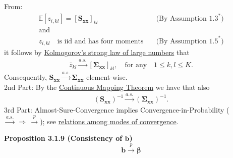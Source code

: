\documentclass[]{book}
\theoremstyle{definition}
\theoremstyle{definition}
\theoremstyle{definition}
\theoremstyle{remark}
\begin{document}
From: \[\begin{array}{ll}
\mathbb{E}[z_{i,kl}]=[\mathbf{S}_{\mathbf{x}\mathbf{x}}]_{kl}&\quad\text{(By Assumption 1.3}^\ast)\\
\text{and}&\\
z_{i,kl}\quad\text{is iid and has four moments}      &\quad\text{(By Assumption 1.5}^\ast)
\end{array}\] it follows by \href{https://www.statlect.com/asymptotic-theory/law-of-large-numbers}{Kolmogorov's strong law of large numbers}
that \[\begin{align*}
\bar{z}_{kl}\overset{a.s.}\longrightarrow \left[\boldsymbol{\Sigma}_{\mathbf{x}\mathbf{x}}\right]_{kl},\quad\text{for any}\quad 1\leq k,l\leq K.
\end{align*}\]
Consequently,
\(\mathbf{S}_{\mathbf{x}\mathbf{x}}\overset{a.s.}\longrightarrow\boldsymbol{\Sigma}_{\mathbf{x}\mathbf{x}}\)
element-wise.\\
2nd Part: By the \href{https://www.statlect.com/asymptotic-theory/continuous-mapping-theorem}{Continuous Mapping Theorem}
we have that also \[\begin{align*}
\left(\mathbf{S}_{\mathbf{x}\mathbf{x}}\right)^{-1}\overset{a.s.}\longrightarrow\left(\boldsymbol{\Sigma}_{\mathbf{x}\mathbf{x}}\right)^{-1}.
\end{align*}\]
3rd Part: Almost-Sure-Convergence implies Convergence-in-Probability
(\(\overset{a.s.}\longrightarrow \, \Rightarrow \, \overset{p}\longrightarrow\)); see \href{https://www.statlect.com/asymptotic-theory/relations-among-modes-of-convergence}{relations among modes of convergence}.

\textbf{Proposition 3.1.9 (Consistency of \(\mathbf{b}\))}
\[\mathbf{b}\overset{p}\longrightarrow\boldsymbol{\beta}\]
\end{document}
